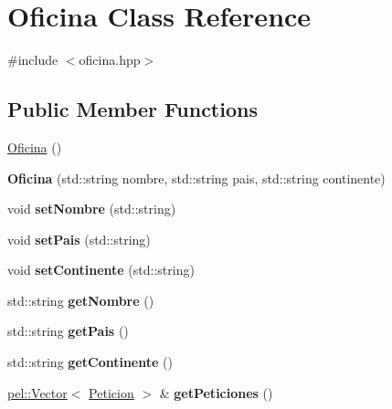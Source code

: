 \hypertarget{classOficina}{}\section{Oficina Class Reference}
\label{classOficina}


{\ttfamily \#include $<$oficina.\+hpp$>$}

\subsection*{Public Member Functions}
\begin{DoxyCompactItemize}
\item 
\hyperlink{classOficina_adfc639739930fedda32e7790583f2342}{Oficina} ()
\item 
\hypertarget{classOficina_a98663f13af9d8679a234e3c68c4ceb36}{}{\bfseries Oficina} (std\+::string nombre, std\+::string pais, std\+::string continente)\label{classOficina_a98663f13af9d8679a234e3c68c4ceb36}

\item 
\hypertarget{classOficina_ae016add6b9338df63c58a850b3503d45}{}void {\bfseries set\+Nombre} (std\+::string)\label{classOficina_ae016add6b9338df63c58a850b3503d45}

\item 
\hypertarget{classOficina_a69be721387f2b3b97b0c6a6326d046e5}{}void {\bfseries set\+Pais} (std\+::string)\label{classOficina_a69be721387f2b3b97b0c6a6326d046e5}

\item 
\hypertarget{classOficina_a0b715231faa1dc769fd6006f8136626f}{}void {\bfseries set\+Continente} (std\+::string)\label{classOficina_a0b715231faa1dc769fd6006f8136626f}

\item 
\hypertarget{classOficina_ad9ef736810c608638d70fd003db62661}{}std\+::string {\bfseries get\+Nombre} ()\label{classOficina_ad9ef736810c608638d70fd003db62661}

\item 
\hypertarget{classOficina_aef61125dc2cbbe125b4c027196e9cbb3}{}std\+::string {\bfseries get\+Pais} ()\label{classOficina_aef61125dc2cbbe125b4c027196e9cbb3}

\item 
\hypertarget{classOficina_a937105d318a0554fe2ce00cd59f35160}{}std\+::string {\bfseries get\+Continente} ()\label{classOficina_a937105d318a0554fe2ce00cd59f35160}

\item 
\hypertarget{classOficina_ae2f47f59037d3c8bec6bb3992c7484ca}{}\hyperlink{classpel_1_1Vector}{pel\+::\+Vector}$<$ \hyperlink{classPeticion}{Peticion} $>$ \& {\bfseries get\+Peticiones} ()\label{classOficina_ae2f47f59037d3c8bec6bb3992c7484ca}

\end{DoxyCompactItemize}


